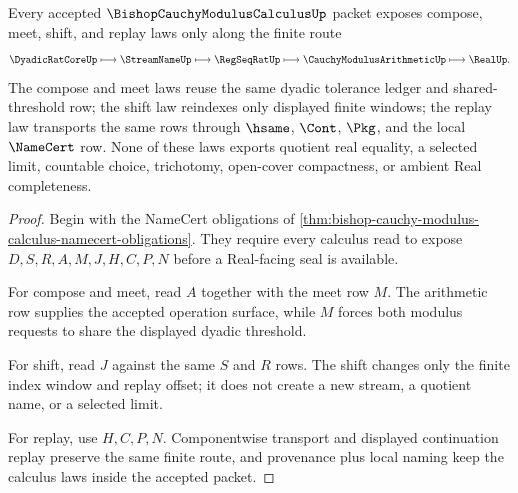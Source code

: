 \begin{theorem}
\label{thm:bishop-cauchy-modulus-calculus-operation-laws}
Every accepted $\BishopCauchyModulusCalculusUp$ packet exposes compose, meet, shift, and replay laws only along the finite route
$$
\DyadicRatCoreUp \longmapsto \StreamNameUp \longmapsto \RegSeqRatUp \longmapsto \CauchyModulusArithmeticUp \longmapsto \RealUp .
$$
The compose and meet laws reuse the same dyadic tolerance ledger and shared-threshold row; the shift law reindexes only displayed finite windows; the replay law transports the same rows through $\hsame$, $\Cont$, $\Pkg$, and the local $\NameCert$ row. None of these laws exports quotient real equality, a selected limit, countable choice, trichotomy, open-cover compactness, or ambient Real completeness.
\end{theorem}
\begin{proof}
Begin with the NameCert obligations of \autoref{thm:bishop-cauchy-modulus-calculus-namecert-obligations}. They require every calculus read to expose $D,S,R,A,M,J,H,C,P,N$ before a Real-facing seal is available.

For compose and meet, read $A$ together with the meet row $M$. The arithmetic row supplies the accepted operation surface, while $M$ forces both modulus requests to share the displayed dyadic threshold.

For shift, read $J$ against the same $S$ and $R$ rows. The shift changes only the finite index window and replay offset; it does not create a new stream, a quotient name, or a selected limit.

For replay, use $H,C,P,N$. Componentwise transport and displayed continuation replay preserve the same finite route, and provenance plus local naming keep the calculus laws inside the accepted packet.
\end{proof}


